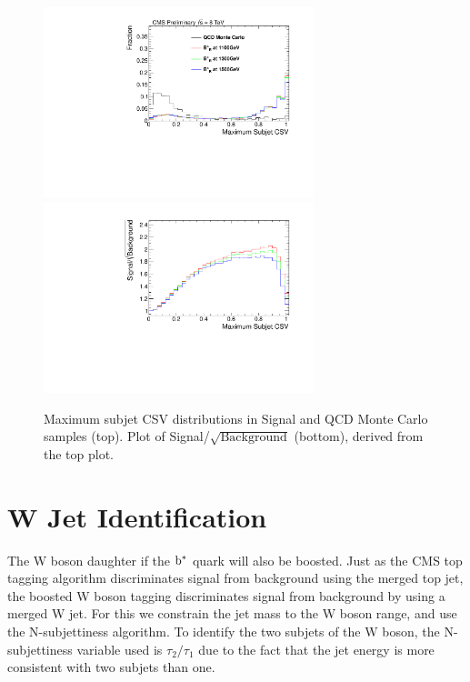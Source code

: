 \begin{figure}[htcb]
\begin{center}
\includegraphics[width=0.7\textwidth]{AN-14-049/figs/TopBDiscsjmaxCSVrightCompqcdandsignal.pdf}\\
\includegraphics[width=0.7\textwidth]{AN-14-049/figs/TopBDiscsjmaxCSVrightSNRqcdandsignal.pdf}
\caption{
Maximum subjet CSV distributions in Signal and QCD Monte Carlo samples (top).  Plot of Signal/$\sqrt{\text{Background}}$ (bottom), derived from the top plot. 
}
\label{figs:bsBtagCOMP}
\end{center}
\end{figure}


\section{W Jet Identification}
\label{sec:bswtagging}
The W boson daughter if the $\mathrm{b}^{*}$ quark will also be boosted.  Just as the CMS top tagging algorithm discriminates signal from background 
using the merged top jet, the boosted W boson tagging discriminates signal from background by using a merged W jet.  For this we constrain the 
jet mass to the W boson range, and use the N-subjettiness algorithm.  To identify the two subjets of the W boson, the N-subjettiness variable used is 
$\tau_{2}/\tau_{1}$ due to the fact that the jet energy is more consistent with two subjets than one.
 
